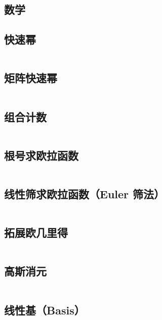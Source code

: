 \documentclass[a4paper]{article}
\begin{document}
\begin{multicols}{2}
\begin{spacing}{0.6}
\section{数学}

\subsection{快速幂}
\inputminted{cpp}{\detokenize{Template/数学/01A - 快速幂.txt}}

\subsection{矩阵快速幂}
\inputminted{cpp}{\detokenize{Template/数学/01B - 矩阵快速幂.txt}}
\columnbreak

\subsection{组合计数}
\inputminted{cpp}{\detokenize{Template/数学/02 - 组合计数.txt}}
\columnbreak

\subsection{根号求欧拉函数}
\inputminted{cpp}{\detokenize{Template/数学/03A - 根号求欧拉函数.txt}}

\subsection{线性筛求欧拉函数（Euler 筛法）}
\inputminted{cpp}{\detokenize{Template/数学/03B - 线性筛求欧拉函数（Euler筛法）.txt}}

\subsection{拓展欧几里得}
\inputminted{cpp}{\detokenize{Template/数学/04 - 拓展欧几里得.txt}}

\columnbreak

\subsection{高斯消元}
\inputminted{cpp}{\detokenize{Template/数学/05 - 高斯消元.txt}}

\subsection{线性基（Basis）}
\inputminted{cpp}{\detokenize{Template/数学/06 - 线性基（Basis）.txt}}

\end{spacing}
\end{multicols}
\end{document}
